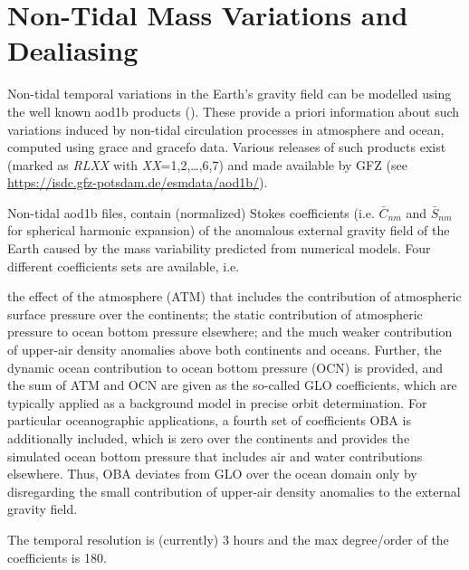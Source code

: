 \section{Non-Tidal Mass Variations and Dealiasing}\label{sec:non-tidal_mass_variations_and_dealiasing}

Non-tidal temporal variations in the Earth's gravity field can be modelled using the 
well known \gls{aod1b} products (\cite{aod1b07}). These provide a priori information 
about such variations induced by non-tidal circulation processes in atmosphere 
and ocean, computed using \gls{grace} and \gls{gracefo} data. Various releases 
of such products exist (marked as \emph{RLXX} with \emph{XX}=1,2,\dots ,6,7) and 
made available by GFZ (see \url{https://isdc.gfz-potsdam.de/esmdata/aod1b/}). 

Non-tidal \gls{aod1b} files, contain (normalized) Stokes coefficients (i.e. 
$\bar{C}_{nm}$ and $\bar{S}_{nm}$ for spherical harmonic expansion) 
of the anomalous external gravity field of the Earth caused by the mass variability 
predicted from numerical models. Four different coefficients sets are available, 
i.e. 

\begin{displayquote}
the effect of the atmosphere (ATM) that includes the contribution of atmospheric surface 
pressure over the continents; the static contribution of atmospheric pressure to ocean bottom 
pressure elsewhere; and the much weaker contribution of upper-air density anomalies 
above both continents and oceans. Further, the dynamic ocean contribution to ocean 
bottom pressure (OCN) is provided, and the sum of ATM and OCN are given as the so-called 
GLO coefficients, which are typically applied as a background model in precise
orbit determination. For particular oceanographic applications, a fourth set of 
coefficients OBA is additionally included, which is zero over the continents and 
provides the simulated ocean bottom pressure that includes air and water 
contributions elsewhere. Thus, OBA deviates from GLO over the ocean domain only 
by disregarding the small contribution of upper-air density anomalies to 
the external gravity field.
\end{displayquote} \cite{Dobslaw2017}

The temporal resolution is (currently) 3 hours and the max degree/order of the 
coefficients is 180.
